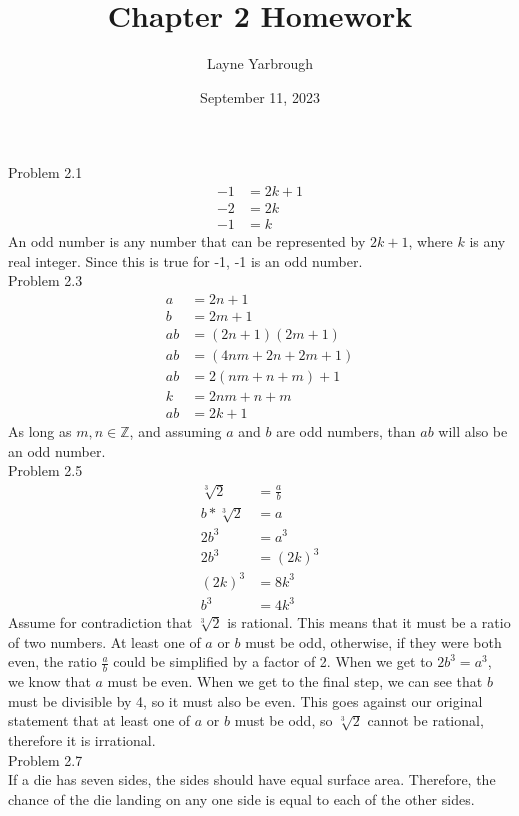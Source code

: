 \documentclass{article}
\title{Chapter 2 Homework}
\author{Layne Yarbrough}
\date{September 11, 2023}
\begin{document}
\maketitle
Problem 2.1
\begin{align*}
  -1 &= 2k+1\\
  -2 &= 2k\\
  -1 &= k
\end{align*}
An odd number is any number that can be represented by $2k+1$, where $k$ is any real integer. Since this is true for -1, -1 is an odd number.\\

Problem 2.3
\begin{align*}
  a &= 2n+1\\
  b &= 2m+1\\
  ab &= (2n+1)(2m+1)\\
  ab &= (4nm + 2n + 2m + 1)\\
  ab &= 2(nm + n + m) + 1\\
  k &= 2nm + n + m\\
  ab &= 2k+1
\end{align*}
As long as $m, n \in \mathbb{Z}$, and assuming $a$ and $b$ are odd numbers, than $ab$ will also be an odd number.\\

Problem 2.5
\begin{align*}
  \sqrt[3]{2} &= \frac{a}{b}\\
  b * \sqrt[3]{2} &= a\\
  2b^3 &= a^3\\
  2b^3 &= (2k)^3\\
  (2k)^3 &= 8k^3\\
  b^3 &= 4k^3
\end{align*}
Assume for contradiction that $\sqrt[3]{2}$ is rational. This means that it must be a ratio of two numbers. At least one of $a$ or $b$ must be odd, otherwise, if they were both even, the ratio $\frac{a}{b}$ could be simplified by a factor of 2. When we get to $2b^3 = a^3$, we know that $a$ must be even. When we get to the final step, we can see that $b$ must be divisible by 4, so it must also be even. This goes against our original statement that at least one of $a$ or $b$ must be odd, so $\sqrt[3]{2}$ cannot be rational, therefore it is irrational.\\

Problem 2.7\\
If a die has seven sides, the sides should have equal surface area. Therefore, the chance of the die landing on any one side is equal to each of the other sides.\\
\end{document}
